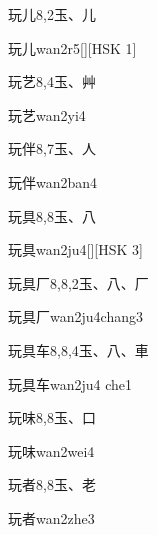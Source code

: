 \begin{Entry}{玩儿}{8,2}{⽟、⼉}
  \begin{Phonetics}{玩儿}{wan2r5}[][HSK 1]
  \end{Phonetics}
\end{Entry}

\begin{Entry}{玩艺}{8,4}{⽟、⾋}
  \begin{Phonetics}{玩艺}{wan2yi4}
  \end{Phonetics}
\end{Entry}

\begin{Entry}{玩伴}{8,7}{⽟、⼈}
  \begin{Phonetics}{玩伴}{wan2ban4}
  \end{Phonetics}
\end{Entry}

\begin{Entry}{玩具}{8,8}{⽟、⼋}
  \begin{Phonetics}{玩具}{wan2ju4}[][HSK 3]
  \end{Phonetics}
\end{Entry}

\begin{Entry}{玩具厂}{8,8,2}{⽟、⼋、⼚}
  \begin{Phonetics}{玩具厂}{wan2ju4chang3}
  \end{Phonetics}
\end{Entry}

\begin{Entry}{玩具车}{8,8,4}{⽟、⼋、⾞}
  \begin{Phonetics}{玩具车}{wan2ju4 che1}
  \end{Phonetics}
\end{Entry}

\begin{Entry}{玩味}{8,8}{⽟、⼝}
  \begin{Phonetics}{玩味}{wan2wei4}
  \end{Phonetics}
\end{Entry}

\begin{Entry}{玩者}{8,8}{⽟、⽼}
  \begin{Phonetics}{玩者}{wan2zhe3}
  \end{Phonetics}
\end{Entry}

